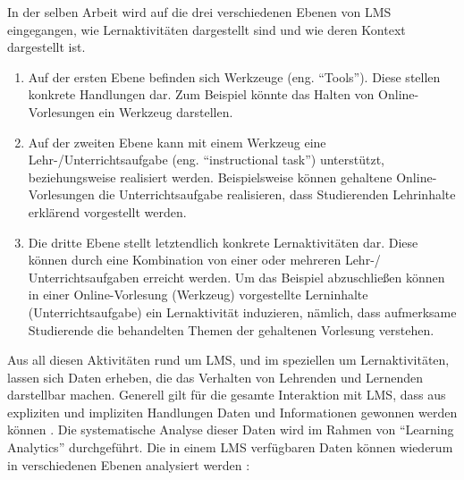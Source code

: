 In der selben Arbeit \autocite[S.247]{SCHOONENBOOM2014247} wird auf die drei verschiedenen Ebenen von \ac{LMS} eingegangen, wie Lernaktivitäten dargestellt sind und wie deren Kontext dargestellt ist.
\begin{enumerate}
	\item Auf der ersten Ebene befinden sich Werkzeuge (eng. \enquote{Tools}). Diese stellen konkrete Handlungen dar. Zum Beispiel könnte das Halten von Online-Vorlesungen ein Werkzeug darstellen.
	\item Auf der zweiten Ebene kann mit einem Werkzeug eine Lehr-/Unterrichtsaufgabe (eng. \enquote{instructional task}) unterstützt, beziehungsweise realisiert werden. Beispielsweise können gehaltene Online-Vorlesungen die Unterrichtsaufgabe realisieren, dass Studierenden Lehrinhalte erklärend vorgestellt werden.
	\item Die dritte Ebene stellt letztendlich konkrete Lernaktivitäten dar. Diese können durch eine Kombination von einer oder mehreren Lehr-/ Unterrichtsaufgaben erreicht werden. Um das Beispiel abzuschließen können in einer Online-Vorlesung (Werkzeug) vorgestellte Lerninhalte (Unterrichtsaufgabe) ein Lernaktivität induzieren, nämlich, dass aufmerksame Studierende die behandelten Themen der gehaltenen Vorlesung verstehen.	
\end{enumerate}

Aus all diesen Aktivitäten rund um \ac{LMS}, und im speziellen um Lernaktivitäten, lassen sich Daten erheben, die das Verhalten von Lehrenden und Lernenden darstellbar machen. Generell gilt für die gesamte Interaktion mit \ac{LMS}, dass aus expliziten und impliziten Handlungen Daten und Informationen gewonnen werden können \autocite[S.26]{2012HorizonReport}. Die systematische Analyse dieser Daten wird im Rahmen von \enquote{Learning Analytics} durchgeführt. Die in einem \ac{LMS} verfügbaren Daten können wiederum in verschiedenen Ebenen analysiert werden \autocite[S.2f]{learningAnalyticsImHochschulkontext} \autocite{penetratingTheFogAnalyticsInLearningAndEducation}:

